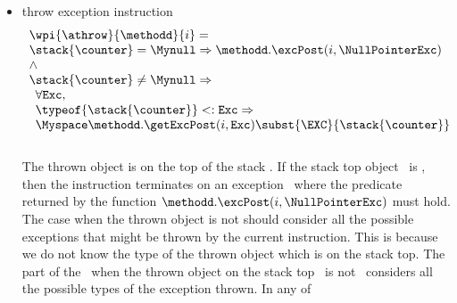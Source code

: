 \begin{itemize}
						
						
						
						
					
\item throw exception instruction \\
				
							$$ \begin{array}{l}
							          \wpi{\athrow} {\methodd}{i}  = \\
								    \stack{\counter} = \Mynull \Rightarrow  \methodd.\excPost( i, \NullPointerExc) \\
								     \wedge \\
							          \stack{\counter} \neq \Mynull \Rightarrow \\
								    \begin{array}{l}  
								       \forall  \mbox{\rm\texttt{Exc}}, \\  
								        \typeof{\stack{\counter}} <: \mbox{\rm\texttt{Exc}}   \Rightarrow \\
								        \Myspace \methodd.\getExcPost( i, \mbox{\rm\texttt{Exc}}    )\subst{ \EXC }{\stack{\counter}  } 
								                     
								    \end{array} 
							   \end{array}
							$$ \\
						The thrown object is on the top of the stack \stack{\counter}.
						If the stack top object \stack{\counter} \ is \Mynull, then the instruction \athrow{}  terminates on an exception
						\NullPointerExc \ where the predicate returned by the function $ \methodd.\excPost( i, \NullPointerExc)$ must hold.
						The case when  the thrown object is not \Mynull{}  should consider all the possible exceptions that
						might be thrown by the current instruction. This is because we do not know the type of the thrown object which is
						on the stack top.
						The part of the \fwpi \ when the thrown object on the stack top  \stack{\counter} \ is not \Mynull \ considers all the possible types
						of the exception thrown. In any of 
						

\end{itemize}
